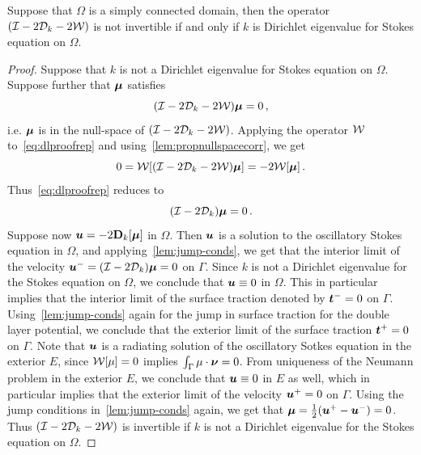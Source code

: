 \begin{thrm}
\label{thm:dlmain}
Suppose that $\Omega$ is a simply connected domain, then the operator
$(\mathcal I - 2{\mathcal D}_{k} - 2 {\mathcal W})$ is not invertible if and only if $k$ is 
Dirichlet eigenvalue for Stokes equation on $\Omega$.
\end{thrm}
\begin{proof}
Suppose that $k$ is not a Dirichlet eigenvalue for Stokes equation on
$\Omega$. 
Suppose further that ${\boldsymbol \mu}$ satisfies
\begin{equation}
(\mathcal I - 2{\mathcal D}_{k} - 2{\mathcal W}) {\boldsymbol \mu} = 0 \, , \label{eq:dlproofrep}
\end{equation}
i.e. ${\boldsymbol \mu}$ is in the null-space
of $(\mathcal I - 2 {\mathcal D}_{k} - 2 {\mathcal W})$. 
Applying the operator ${\mathcal W}$ to~\cref{eq:dlproofrep} and 
using~\cref{lem:propnullspacecorr}, we get
\begin{equation}
0 = {\mathcal W} [(\mathcal I - 2{\mathcal D}_{k} - 2{\mathcal W}){\boldsymbol \mu}] = -2{\mathcal W} [{\boldsymbol \mu}] \, .
\end{equation}
Thus~\cref{eq:dlproofrep} reduces to
\begin{equation}
(\mathcal I - 2 {\mathcal D}_{k}){\boldsymbol \mu} = 0\, .
\end{equation}
Suppose now ${\boldsymbol u} = -2{\bf D}_{k}[{\boldsymbol \mu}]$ in $\Omega$.
Then ${\boldsymbol u}$ is a solution to the oscillatory Stokes equation in $\Omega$,
and applying~\cref{lem:jump-conds}, we get that the interior
limit of the velocity ${\boldsymbol u}^{-} = (\mathcal I - 2{\mathcal D}_{k}) {\boldsymbol \mu} = 0$ on $\Gamma$. 
Since $k$ is not a Dirichlet eigenvalue for the Stokes equation on 
$\Omega$, we conclude that ${\boldsymbol u} \equiv 0$ in $\Omega$. 
This in particular implies that the interior limit of the surface traction
denoted by ${\boldsymbol t}^{-} = 0$ on $\Gamma$. 
Using~\cref{lem:jump-conds} again for the jump in surface traction
for the double layer potential, we conclude that the exterior limit
of the surface traction ${\boldsymbol t}^{+} = 0$ on $\Gamma$. 
Note that ${\boldsymbol u}$ is a radiating solution of the oscillatory
Sotkes equation in the exterior $E$, since
${\mathcal W}[\mu] = 0$ implies $\int_{\Gamma} \mu \cdot {\boldsymbol \nu} = 0$.
From uniqueness of the Neumann problem in the exterior $E$, we conclude
that ${\boldsymbol u} \equiv 0$ in $E$ as well, which in particular implies that
the exterior limit of the velocity ${\boldsymbol u}^{+}=0$ on $\Gamma$.   
Using the jump conditions in~\cref{lem:jump-conds} again, we
get that ${\boldsymbol \mu} = \frac{1}{2}({\boldsymbol u}^{+} - {\boldsymbol u}^{-}) = 0$.
Thus $(\mathcal I - 2{\mathcal D}_{k} - 2{\mathcal W})$ is invertible if $k$ is not a Dirichlet
eigenvalue for the Stokes equation on $\Omega$.


\end{proof}
